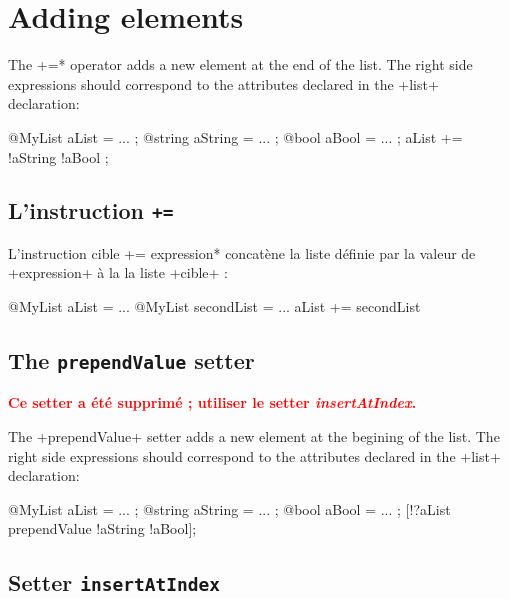 \section{Adding elements}


The  \ggs*+=* operator adds a new element at the end of the list. The right side expressions should correspond to the attributes declared in the \ggs+list+ declaration:\\

\begin{galgas}
@MyList aList = ... ;
@string aString = ... ;
@bool aBool = ... ;
aList += !aString !aBool ;
\end{galgas}


\subsection{L'instruction \texttt{+=}}

L'instruction \ggs*cible += expression* concatène la liste définie par la valeur de \ggs+expression+ à la la liste \ggs+cible+ :

\begin{galgas}
@MyList aList = ...
@MyList secondList = ...
aList += secondList
\end{galgas}



\subsection{The \texttt{prependValue} setter}

{\bf \textcolor{red}{Ce setter a été supprimé ; utiliser le setter \emph{insertAtIndex}.}}

The \ggs+prependValue+ setter adds a new element at the begining of the list. The right side expressions should correspond to the attributes declared in the  \ggs+list+ declaration:

\begin{galgas}
@MyList aList = ... ;
@string aString = ... ;
@bool aBool = ... ;
[!?aList prependValue !aString !aBool];
\end{galgas}




\subsection{Setter \texttt{insertAtIndex}}

